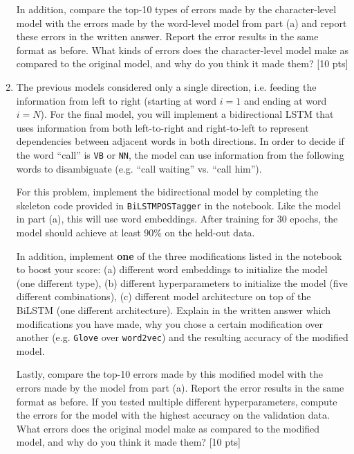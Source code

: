 \begin{enumerate}
    In addition, compare the top-10 types of errors made by the character-level model with the errors made by the word-level model from part (a) and report these errors in the written answer.
    Report the error results in the same format as before.
    What kinds of errors does the character-level model make as compared to the original model, and why do you think it made them? [10 pts]
    
    \item 
    The previous models considered only a single direction, i.e. feeding the information from left to right (starting at word $i=1$ and ending at word $i=N$).
    For the final model, you will implement a bidirectional LSTM that uses information from both left-to-right and right-to-left to represent dependencies between adjacent words in both directions.
    In order to decide if the word ``call'' is \texttt{VB} or \texttt{NN}, the model can use information from the following words to disambiguate (e.g. ``call waiting'' vs. ``call him'').
    
    For this problem, implement the bidirectional model by completing the skeleton code provided in \texttt{BiLSTMPOSTagger} in the notebook.
    Like the model in part (a), this will use word embeddings.
    After training for 30 epochs, the model should achieve at least 90\% on the held-out data.
    
    In addition, implement \textbf{one} of the three modifications listed in the notebook to boost your score: (a) different word embeddings to initialize the model (one different type), (b) different hyperparameters to initialize the model (five different combinations), (c) different model architecture on top of the BiLSTM (one different architecture).
    Explain in the written answer which modifications you have made, why you chose a certain modification over another (e.g. \texttt{Glove} over \texttt{word2vec}) and the resulting accuracy of the modified model.
    
    Lastly, compare the top-10 errors made by this modified model with the errors made by the model from part (a).
    Report the error results in the same format as before.
    If you tested multiple different hyperparameters, compute the errors for the model with the highest accuracy on the validation data.
    What errors does the original model make as compared to the modified model, and why do you think it made them? [10 pts]
    
\end{enumerate}